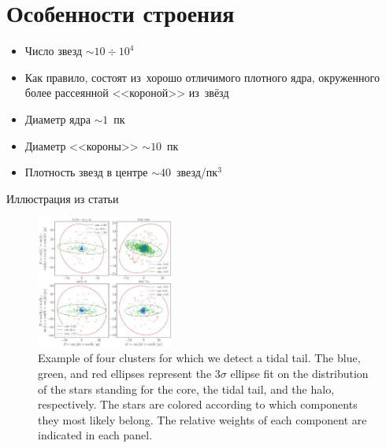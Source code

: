 \documentclass{beamer}
\begin{document}
    \section{Особенности строения}
    \begin{frame}
        \Large
        \begin{itemize}
            \item Число звезд $\sim 10 \div 10^4$
            \item Как правило, состоят из~хорошо отличимого плотного ядра, окруженного более рассеянной <<короной>> из~звёзд
            \item Диаметр ядра $\sim 1$~пк
            \item Диаметр <<короны>> $\sim 10$~пк
            \item Плотность звезд в центре $\sim 40$~звезд/пк$^3$
        \end{itemize}
    \end{frame}
    \begin{frame}
        Иллюстрация из статьи\cite{AAA}
        \begin{figure}
            \centering
                \includegraphics[width=0.4\textwidth]{pictures/Class1.jpg}
                \caption{Example of four clusters for which we detect a tidal tail. The blue, green, and red ellipses represent the 3$\sigma$ ellipse fit on the distribution of the stars standing for the core, 
                the tidal tail, and the halo, respectively. 
                The stars are colored according to which components they most likely belong. 
                The relative weights of each component are indicated in each panel.}
        \end{figure}
    \end{frame}
\end{document}
